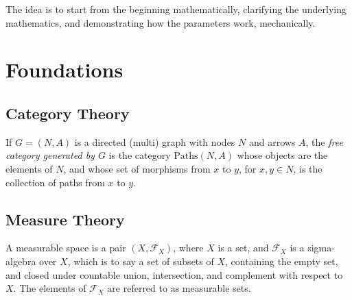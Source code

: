 \documentclass[twoside]{article} %
\theoremstyle{plain}
\theoremstyle{definition}
\begin{document}
%
%

    The idea is to start from the beginning mathematically, clarifying the underlying mathematics, and demonstrating how the parameters work, mechanically.
    
    \tableofcontents
    \clearpage
    
    \section{Foundations}
    
    
    \subsection{Category Theory}
    \begin{defn}
        If $G = (N, A)$ is a directed (multi) graph with nodes $N$ and arrows $A$, the \emph{free category generated by $G$} is the category $\mathrm{Paths}(N,A)$ whose objects are the elements of $N$, and whose set of morphisms from $x$ to $y$, for $x,y \in N$, is the collection of paths from $x$ to $y$.
    \end{defn}
    
    \subsection{Measure Theory}
    
    \begin{defn}
        A measurable space is a pair $(X, \mathcal F_X)$, where $X$ is a set, and   $\mathcal F_X$ is a sigma-algebra over $X$, which is to say a set of subsets of $X$, containing the empty set, and closed under countable union, intersection, and complement with respect to $X$.
        The elements of $\mathcal F_X$ are referred to as measurable sets.
    \end{defn}
    
\end{document}
